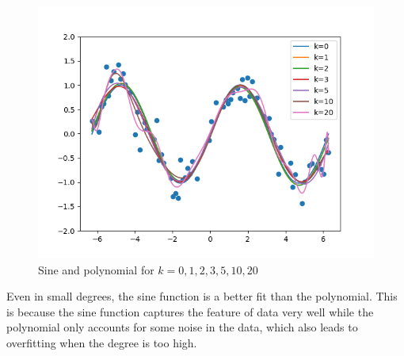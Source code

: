 \begin{answer}
    \begin{figure}[H]
        \includegraphics[width=\textwidth]{../src/featuremaps/sine.png}
        \caption{Sine and polynomial for $k=0,1,2,3,5,10,20$}
    \end{figure}
    Even in small degrees, the sine function is a better fit than the polynomial. 
    This is because the sine function captures the feature of data very well while
    the polynomial only accounts for some noise in the data, which also leads to
    overfitting when the degree is too high.
\end{answer}
